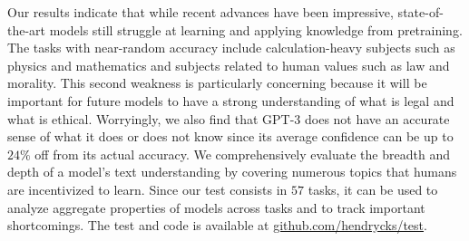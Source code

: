 

Our results indicate that while recent advances have been impressive, state-of-the-art models still struggle at learning and applying knowledge from pretraining.
The tasks with near-random accuracy include calculation-heavy subjects such as physics and mathematics and subjects related to human values such as law and morality. 
This second weakness is particularly concerning because it will be important for future models to have a strong understanding of what is legal and what is ethical. Worryingly, we also find that GPT-3 does not have an accurate sense of what it does or does not know since its average confidence can be up to $24\%$ off from its actual accuracy.
We comprehensively evaluate the breadth and depth of a model's text understanding by covering numerous topics that humans are incentivized to learn.
Since our test consists in $57$ tasks, it can be used to analyze aggregate properties of models across tasks and to track important shortcomings.
The test and code is available at \href{https://github.com/hendrycks/test}{github.com/hendrycks/test}. %

